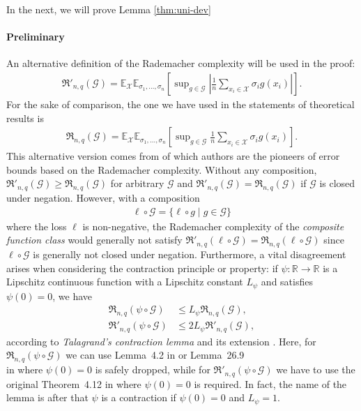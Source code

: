 \documentclass[12pt]{article}
\newcommand{\bE}{\mathbb{E}}
\newcommand{\bR}{\mathbb{R}}
\newcommand{\cG}{\mathcal{G}}
\newcommand{\cX}{\mathcal{X}}
\newcommand{\fR}{\mathfrak{R}}
\theoremstyle{definition}
\begin{document}
In the next, we will prove Lemma \ref{thm:uni-dev}
\paragraph{Preliminary}%
An alternative definition of the Rademacher complexity will be used in the proof:
\begin{align*}
\fR'_{n,q}(\cG) = \bE_\cX\bE_{\sigma_1,\ldots,\sigma_n}\left[ \sup\nolimits_{g\in\cG}
\left|\frac{1}{n}\sum\nolimits_{x_i\in\cX}\sigma_ig(x_i)\right| \right].
\end{align*}
For the sake of comparison, the one we have used in the statements of theoretical results is
\begin{align*}
\fR_{n,q}(\cG) = \bE_\cX\bE_{\sigma_1,\ldots,\sigma_n}\left[ \sup\nolimits_{g\in\cG}
\frac{1}{n}\sum\nolimits_{x_i\in\cX}\sigma_ig(x_i) \right].
\end{align*}
This alternative version comes from \cite{koltchinskii2001rademacher} of which authors are the pioneers of error bounds based on the Rademacher complexity. Without any composition, $\fR'_{n,q}(\cG)\ge\fR_{n,q}(\cG)$ for arbitrary $\cG$ and $\fR'_{n,q}(\cG)=\fR_{n,q}(\cG)$ if $\cG$ is closed under negation. However, with a composition \begin{align*}
\ell\circ\cG=\{\ell\circ g\mid g\in\cG\}
\end{align*}
where the loss $\ell$ is non-negative, the Rademacher complexity of the \emph{composite function class} would generally not satisfy $\fR'_{n,q}(\ell\circ\cG)=\fR_{n,q}(\ell\circ\cG)$ since $\ell\circ\cG$ is generally not closed under negation. Furthermore, a vital disagreement arises when considering the contraction principle or property: if $\psi:\bR\to\bR$ is a Lipschitz continuous function with a Lipschitz constant $L_\psi$ and satisfies $\psi(0)=0$, we have
\begin{align*}
\fR_{n,q}(\psi\circ\cG) &\le L_\psi\fR_{n,q}(\cG),\\
\fR'_{n,q}(\psi\circ\cG) &\le 2L_\psi\fR'_{n,q}(\cG),
\end{align*}
according to \emph{Talagrand's contraction lemma} \cite{ledoux2013probability} and its extension \cite{mohri2012foundations,shalev2014understanding}. Here, for $\fR_{n,q}(\psi\circ\cG)$ we can use Lemma~4.2 in \cite{mohri2012foundations} or Lemma~26.9 \\in \cite{shalev2014understanding} where $\psi(0)=0$ is safely dropped, while for $\fR'_{n,q}(\psi\circ\cG)$ we have to use the original Theorem~4.12 in \cite{ledoux2013probability} where $\psi(0)=0$ is required. In fact, the name of the lemma is after that $\psi$ is a contraction if $\psi(0)=0$ and $L_\psi=1$.
\end{document}
